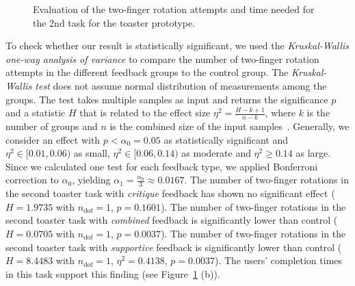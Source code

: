 \documentclass[manuscript]{acmart}
\begin{document}
			\begin{figure}[H]
				\centering
				\caption{Evaluation of the two-finger rotation attempts and time needed for the 2nd task for the toaster prototype.}
				\label{fig:t2_metrics}
			\end{figure}

			To check whether our result is statistically significant, we used the \emph{Kruskal-Wallis one-way analysis of variance} to compare the number of two-finger rotation attempts in the different feedback groups to the control group. The \emph{Kruskal-Wallis test} does not assume normal distribution of measurements among the groups. The test takes multiple samples as input and returns the significance $p$ and a statistic $H$ that is related to the effect size $\eta^2 = \frac{H-k+1}{n-k}$, where $k$ is the number of groups and $n$ is the combined size of the input samples~\cite{Tomczak2014}. Generally, we consider an effect with $p < \alpha_0 = 0.05$ as statistically significant and $\eta^2 \in [0.01,0.06)$ as small, $\eta^2 \in [0.06,0.14)$ as moderate and $\eta^2 \geq 0.14$ as large. Since we calculated one test for each feedback type, we applied Bonferroni correction to $\alpha_0$, yielding $\alpha_1 = \frac{\alpha_0}{3} \approx 0.0167$. The number of two-finger rotations in the second toaster task with \emph{critique} feedback has shown no significant effect ($H = 1.9735$ with $n_\text{dof} = 1$, $p = 0.1601$). The number of two-finger rotations in the second toaster task with \emph{combined} feedback is significantly lower than control ($H = 0.0705$ with $n_\text{dof} = 1$, $p = 0.0037$). The number of two-finger rotations in the second toaster task with \emph{supportive} feedback is significantly lower than control ($H = 8.4483$ with $n_\text{dof} = 1$, $\eta^2 = 0.4138$, $p = 0.0037$). The users' completion times in this task support this finding (see Figure~\ref{fig:t2_metrics} (b)).
\end{document}

